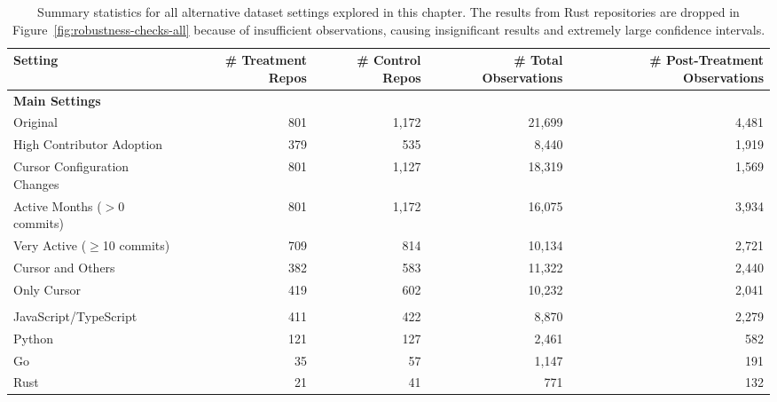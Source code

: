 \begin{table}
\centering
\scriptsize
\caption{Summary statistics for all alternative dataset settings explored in this chapter. The results from Rust repositories are dropped in Figure~\ref{fig:robustness-checks-all} because of insufficient observations, causing insignificant results and extremely large confidence intervals.}
\begin{tabular}{lrrrr}
\toprule
Setting & \# Treatment Repos & \# Control Repos & \# Total Observations & \# Post-Treatment Observations \\
\midrule
\multicolumn{5}{l}{\textbf{Main Settings}} \\
\quad Original & 801 & 1,172 & 21,699 & 4,481 \\
\quad High Contributor Adoption & 379 & 535 & 8,440 & 1,919 \\
\quad Cursor Configuration Changes & 801 & 1,127 & 18,319 & 1,569 \\
\quad Active Months ($>$0 commits) & 801 & 1,172 & 16,075 & 3,934 \\
\quad Very Active ($\geq$10 commits) & 709 & 814 & 10,134 & 2,721 \\
\quad Cursor and Others & 382 & 583 & 11,322 & 2,440 \\
\quad Only Cursor & 419 & 602 & 10,232 & 2,041 \\
\addlinespace
\multicolumn{5}{l}{\textbf{Programming Language Groups}} \\
\quad JavaScript/TypeScript & 411 & 422 & 8,870 & 2,279 \\
\quad Python & 121 & 127 & 2,461 & 582 \\
\quad Go & 35 & 57 & 1,147 & 191 \\
\quad Rust & 21 & 41 & 771 & 132 \\
\bottomrule
\end{tabular}
\label{tab:summary-stats-settings}
\end{table}


